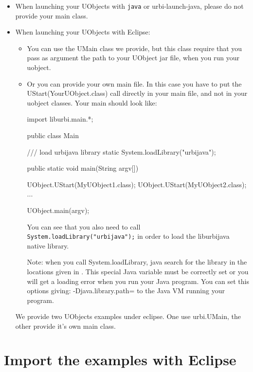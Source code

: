 \begin{itemize}

\item When launching your UObjects with \lstinline{java} or urbi-launch-java, please do not provide your main class.

\item When launching your UObjects with Eclipse:
\begin{itemize}
\item You can use the UMain class we provide, but this class require that you pass as argument the path to your UObject jar file, when you run your uobject.
\item Or you can provide your own main file. In this case you have to put the UStart(YourUObject.class) call directly in your main file, and not in your
uobject classes. Your main should look like:

\begin{cxx}
import liburbi.main.*;

public class Main {

    /// load urbijava library
    static {
        System.loadLibrary("urbijava");
    }

    public static void main(String argv[]) {
      UObject.UStart(MyUObject1.class);
      UObject.UStart(MyUObject2.class);
      ...

      UObject.main(argv);
    }
}
\end{cxx}

You can see that you also need to call \lstinline{System.loadLibrary("urbijava");} in order to load the liburbijava native library.

Note: when you call System.loadLibrary, java search for the library in the locations given
in . This special Java variable must be correctly set or you
will get a loading error when you run your Java program.
You can set this options giving: -Djava.library.path=
to the Java VM running your program.


\end{itemize}

We provide two UObjects examples under eclipse. One use urbi.UMain, the other provide it's own main class.
\end{itemize}


\section{Import the examples with Eclipse}
\label{sec:uob:apijava:import}

